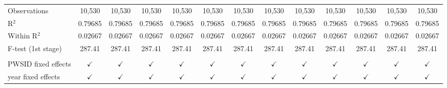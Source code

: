 \begin{table}[htbp]
\begin{adjustbox}{width = \textwidth, center}
\begin{tabular}{lcccccccccccc}
          \\
         Observations                            & 10,530                  & 10,530                 & 10,530                               & 10,530                       & 10,530                        & 10,530                       & 10,530                                     & 10,530                             & 10,530                       & 10,530                      & 10,530                                    & 10,530\\  
         R$^2$                                   & 0.79685                 & 0.79685                & 0.79685                              & 0.79685                      & 0.79685                       & 0.79685                      & 0.79685                                    & 0.79685                            & 0.79685                      & 0.79685                     & 0.79685                                   & 0.79685\\  
         Within R$^2$                            & 0.02667                 & 0.02667                & 0.02667                              & 0.02667                      & 0.02667                       & 0.02667                      & 0.02667                                    & 0.02667                            & 0.02667                      & 0.02667                     & 0.02667                                   & 0.02667\\  
         F-test (1st stage)                      & 287.41                  & 287.41                 & 287.41                               & 287.41                       & 287.41                        & 287.41                       & 287.41                                     & 287.41                             & 287.41                       & 287.41                      & 287.41                                    & 287.41\\  
          \\
         PWSID fixed effects                     & $\checkmark$            & $\checkmark$           & $\checkmark$                         & $\checkmark$                 & $\checkmark$                  & $\checkmark$                 & $\checkmark$                               & $\checkmark$                       & $\checkmark$                 & $\checkmark$                & $\checkmark$                              & $\checkmark$\\   
         year fixed effects                      & $\checkmark$            & $\checkmark$           & $\checkmark$                         & $\checkmark$                 & $\checkmark$                  & $\checkmark$                 & $\checkmark$                               & $\checkmark$                       & $\checkmark$                 & $\checkmark$                & $\checkmark$                              & $\checkmark$\\   
         \bottomrule
      \end{tabular}
   \end{adjustbox}
\end{table}


